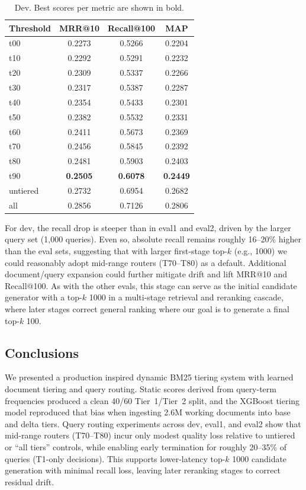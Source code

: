\documentclass[11pt]{article}
\begin{document}
\begin{table}[H]
\centering
\small
\begin{tabular}{lccc}
\toprule
\textbf{Threshold} & \textbf{MRR@10} & \textbf{Recall@100} & \textbf{MAP} \\
\midrule
t00      & 0.2273 & 0.5266 & 0.2204 \\
t10      & 0.2292 & 0.5291 & 0.2232 \\
t20      & 0.2309 & 0.5337 & 0.2266 \\
t30      & 0.2317 & 0.5387 & 0.2287 \\
t40      & 0.2354 & 0.5433 & 0.2301 \\
t50      & 0.2382 & 0.5532 & 0.2331 \\
t60      & 0.2411 & 0.5673 & 0.2369 \\
t70      & 0.2456 & 0.5845 & 0.2392 \\
t80      & 0.2481 & 0.5903 & 0.2403 \\
t90      & \textbf{0.2505} & \textbf{0.6078} & \textbf{0.2449} \\
\midrule
untiered & 0.2732 & 0.6954 & 0.2682 \\
all      & 0.2856 & 0.7126 & 0.2806 \\
\bottomrule
\end{tabular}
\caption{Dev. Best scores per metric are shown in bold.}
\label{tab:dev}
\end{table}

For dev, the recall drop is steeper than in eval1 and eval2, driven by the larger query set (1{,}000 queries). Even so, absolute recall remains roughly 16–20\% higher than the eval sets, suggesting that with larger first-stage top-$k$ (e.g., 1000) we could reasonably adopt mid-range routers (T70–T80) as a default. Additional document/query expansion could further mitigate drift and lift MRR@10 and Recall@100. As with the other evals, this stage can serve as the initial candidate generator with a top-$k$ 1000 in a multi-stage retrieval and reranking cascade, where later stages correct general ranking where our goal is to generate a final top-$k$ 100.



\subsection{Conclusions}
We presented a production inspired dynamic BM25 tiering system with learned document tiering and query routing. Static scores derived from query-term frequencies produced a clean 40/60 Tier~1/Tier~2 split, and the XGBoost tiering model reproduced that bias when ingesting 2.6M working documents into base and delta tiers. Query routing experiments across dev, eval1, and eval2 show that mid-range routers (T70–T80) incur only modest quality loss relative to untiered or “all tiers” controls, while enabling early termination for roughly 20–35\% of queries (T1-only decisions). This supports lower-latency top-$k$ 1000 candidate generation with minimal recall loss, leaving later reranking stages to correct residual drift.
\end{document}

